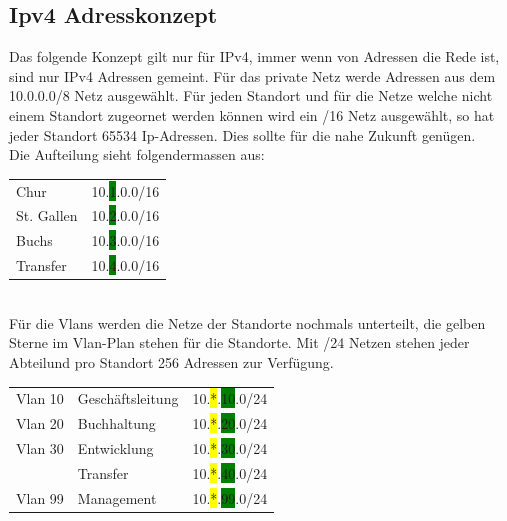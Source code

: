 \documentclass[12pt,a4paper,titlepage]{article}
\begin{document}
\subsection{Ipv4 Adresskonzept} 
Das folgende Konzept gilt nur für IPv4, immer wenn von Adressen die Rede ist, sind nur IPv4 Adressen gemeint.
Für das private Netz werde Adressen aus dem 10.0.0.0/8 Netz ausgewählt. Für jeden Standort und für die Netze welche nicht einem Standort zugeornet werden können wird ein /16 Netz ausgewählt, so hat jeder Standort 65534 Ip-Adressen. Dies sollte für die nahe Zukunft genügen.\\
\newline
Die Aufteilung sieht folgendermassen aus: \\
\newline
\hspace*{1cm} 
\begin{tabular}{ll}
    Chur & 10.\colorbox{green}{1}.0.0/16\\
    St. Gallen & 10.\colorbox{green}{2}.0.0/16\\
    Buchs & 10.\colorbox{green}{3}.0.0/16\\
    Transfer & 10.\colorbox{green}{4}.0.0/16\\
\end{tabular}\\
\newline
Für die Vlans werden die Netze der Standorte nochmals unterteilt, die gelben Sterne im Vlan-Plan stehen für die Standorte. Mit /24 Netzen stehen jeder Abteilund pro Standort 256 Adressen zur Verfügung.\\
\newline
\hspace*{1cm} 
\begin{tabular}{lll}
     Vlan 10 & Geschäftsleitung & 10.\colorbox{yellow}{*}.\colorbox{green}{10}.0/24\\
     Vlan 20 & Buchhaltung & 10.\colorbox{yellow}{*}.\colorbox{green}{20}.0/24\\
     Vlan 30 & Entwicklung & 10.\colorbox{yellow}{*}.\colorbox{green}{30}.0/24\\
             & Transfer & 10.\colorbox{yellow}{*}.\colorbox{green}{40}.0/24\\
     Vlan 99 & Management & 10.\colorbox{yellow}{*}.\colorbox{green}{99}.0/24\\
\end{tabular}
\newpage
\end{document}
